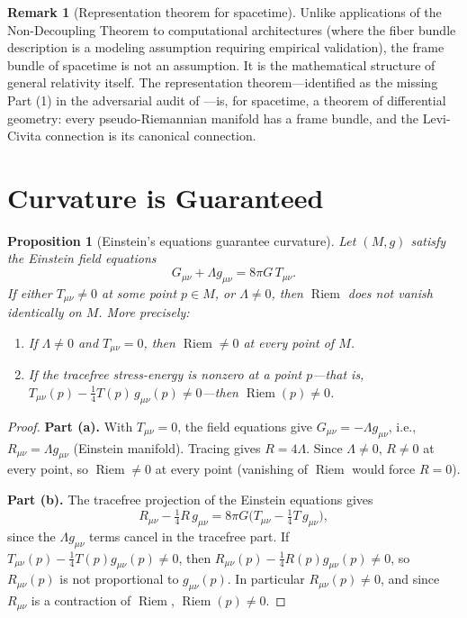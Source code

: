 \documentclass[12pt]{amsart}
\newtheorem{proposition}[theorem]{Proposition}
\theoremstyle{definition}
\newtheorem{remark}[theorem]{Remark}
\newcommand{\Riem}{\operatorname{Riem}}
\begin{document}
\begin{remark}[Representation theorem for spacetime]
Unlike applications of the Non-Decoupling Theorem to computational architectures (where the fiber bundle description is a modeling assumption requiring empirical validation), the frame bundle of spacetime is not an assumption.  It is the mathematical structure of general relativity itself.  The representation theorem---identified as the missing Part (1) in the adversarial audit of \cite{davis2026}---is, for spacetime, a theorem of differential geometry: every pseudo-Riemannian manifold has a frame bundle, and the Levi-Civita connection is its canonical connection.
\end{remark}


\section{Curvature is Guaranteed}

\begin{proposition}[Einstein's equations guarantee curvature]
\label{prop:curvature}
Let $(M, g)$ satisfy the Einstein field equations
\[
G_{\mu\nu} + \Lambda g_{\mu\nu} = 8\pi G \, T_{\mu\nu}.
\]
If either $T_{\mu\nu} \neq 0$ at some point $p \in M$, or $\Lambda \neq 0$, then $\Riem$ does not vanish identically on $M$.  More precisely:
\begin{enumerate}[label=\textup{(\alph*)}]
\item If $\Lambda \neq 0$ and $T_{\mu\nu} = 0$, then $\Riem \neq 0$ at \emph{every} point of $M$.
\item If the tracefree stress-energy is nonzero at a point $p$---that is, $T_{\mu\nu}(p) - \frac{1}{4}T(p)\,g_{\mu\nu}(p) \neq 0$---then $\Riem(p) \neq 0$.
\end{enumerate}
\end{proposition}

\begin{proof}
\textbf{Part (a).}  With $T_{\mu\nu} = 0$, the field equations give $G_{\mu\nu} = -\Lambda g_{\mu\nu}$, i.e., $R_{\mu\nu} = \Lambda g_{\mu\nu}$ (Einstein manifold).  Tracing gives $R = 4\Lambda$.  Since $\Lambda \neq 0$, $R \neq 0$ at every point, so $\Riem \neq 0$ at every point (vanishing of $\Riem$ would force $R = 0$).

\textbf{Part (b).}  The tracefree projection of the Einstein equations gives
\[
R_{\mu\nu} - \tfrac{1}{4}R\,g_{\mu\nu} = 8\pi G\bigl(T_{\mu\nu} - \tfrac{1}{4}T\,g_{\mu\nu}\bigr),
\]
since the $\Lambda g_{\mu\nu}$ terms cancel in the tracefree part.  If $T_{\mu\nu}(p) - \frac{1}{4}T(p)g_{\mu\nu}(p) \neq 0$, then $R_{\mu\nu}(p) - \frac{1}{4}R(p)g_{\mu\nu}(p) \neq 0$, so $R_{\mu\nu}(p)$ is not proportional to $g_{\mu\nu}(p)$.  In particular $R_{\mu\nu}(p) \neq 0$, and since $R_{\mu\nu}$ is a contraction of $\Riem$, $\Riem(p) \neq 0$.
\end{proof}
\end{document}

